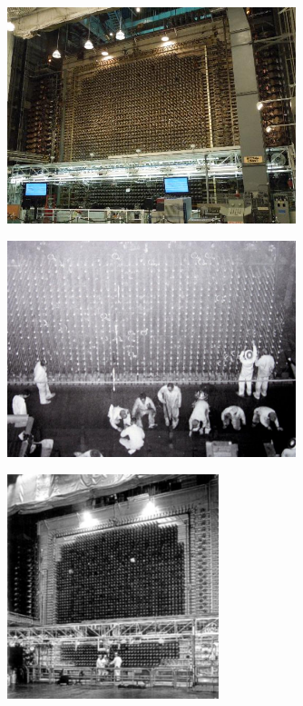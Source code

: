\documentclass[aspectratio=1610,pdftex,dvipsnames,compress,xcolor={dvipsnames}]{beamer}
\begin{document}
\addtocounter{framenumber}{-1} 
\begin{frame}{}
    \begin{figure}
        \centering
        \includegraphics[width=0.75\textwidth]{hb1.jpg}
    \end{figure}
\end{frame}


\begin{frame}{}
    \begin{figure}
        \centering
        \includegraphics[width=0.75\textwidth]{hb2.jpg}
    \end{figure}
\end{frame}


\begin{frame}{}
    \begin{figure}
        \centering
        \includegraphics[width=0.55\textwidth]{hb3.jpg}
    \end{figure}
\end{frame}
\end{document}
